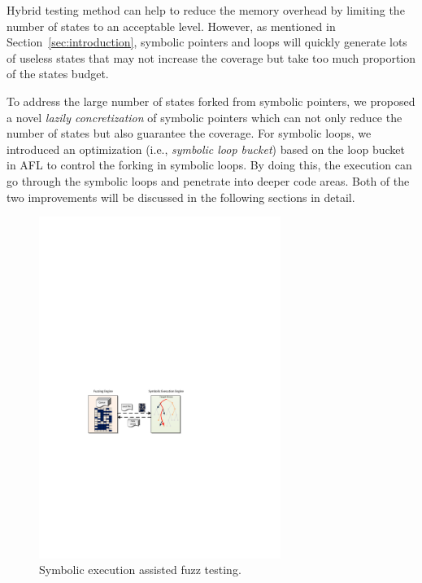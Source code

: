 Hybrid testing method can help to reduce the memory overhead by limiting the number of states to an acceptable level. However, as mentioned in Section~\ref{sec:introduction}, symbolic pointers and loops will quickly generate lots of useless states that may not increase the coverage but take too much proportion of the states budget.

To address the large number of states forked from symbolic pointers, we proposed a novel \textit{lazily concretization} of symbolic pointers which can not only reduce the number of states but also guarantee the coverage. 
For symbolic loops, we introduced an optimization (i.e., \textit{symbolic loop bucket}) based on the loop bucket in AFL to control the forking in symbolic loops. By doing this, the execution can go through the symbolic loops and penetrate into deeper code areas.
Both of the two improvements will be discussed in the following sections in detail.

\begin{figure}
\centering
\includegraphics[width=0.7\textwidth]{figures/s2e-assist.pdf} 
\caption{Symbolic execution assisted fuzz testing.}\label{s2e-assist}
\end{figure}

